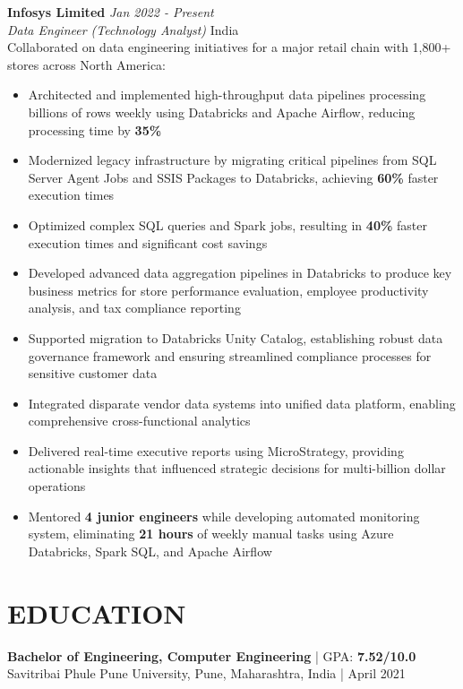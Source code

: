 \documentclass[10pt,letterpaper]{article}
\newcommand{\jobentry}[4]{
    \noindent\textbf{#1} \hfill \textit{#2} \\
    \textit{#3} \hfill #4 \\[4pt]
}
\newcommand{\metric}[1]{\textbf{\color{accent}#1}}
\begin{document}
\jobentry{Infosys Limited}{Jan 2022 - Present}{Data Engineer (Technology Analyst)}{India}
\noindent Collaborated on data engineering initiatives for a major retail chain with 1,800+ stores across North America:

\begin{itemize}[leftmargin=*,nosep,itemsep=3pt,topsep=4pt]
    \item Architected and implemented high-throughput data pipelines processing billions of rows weekly using Databricks and Apache Airflow, reducing processing time by \metric{35\%}

    \item Modernized legacy infrastructure by migrating critical pipelines from SQL Server Agent Jobs and SSIS Packages to Databricks, achieving \metric{60\%} faster execution times

    \item Optimized complex SQL queries and Spark jobs, resulting in \metric{40\%} faster execution times and significant cost savings

    \item Developed advanced data aggregation pipelines in Databricks to produce key business metrics for store performance evaluation, employee productivity analysis, and tax compliance reporting

    \item Supported migration to Databricks Unity Catalog, establishing robust data governance framework and ensuring streamlined compliance processes for sensitive customer data

    \item Integrated disparate vendor data systems into unified data platform, enabling comprehensive cross-functional analytics

    \item Delivered real-time executive reports using MicroStrategy, providing actionable insights that influenced strategic decisions for multi-billion dollar operations

    \item Mentored \textbf{4 junior engineers} while developing automated monitoring system, eliminating \metric{21 hours} of weekly manual tasks using Azure Databricks, Spark SQL, and Apache Airflow
\end{itemize}

\section{EDUCATION}
\noindent\textbf{Bachelor of Engineering, Computer Engineering} | GPA: \textbf{7.52/10.0} \\
Savitribai Phule Pune University, Pune, Maharashtra, India | April 2021
\end{document}
